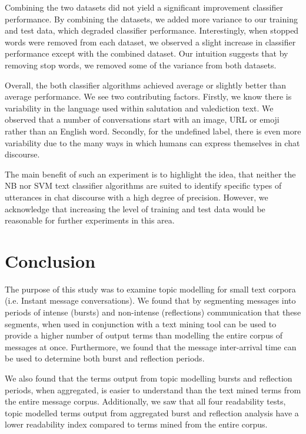 Combining the two datasets did not yield a significant improvement classifier performance. By combining the datasets, we added more variance to our training and test data, which degraded classifier performance. Interestingly, when stopped words were removed from each dataset, we observed a slight increase in classifier performance except with the combined dataset. Our intuition suggests that by removing stop words, we removed some of the variance from both datasets. 

Overall, the both classifier algorithms achieved average or slightly better than average performance. We see two contributing factors. Firstly, we know there is variability in the language used within salutation and valediction text. We observed that a number of conversations start with an image, URL or emoji rather than an English word. Secondly, for the undefined label, there is even more variability due to the many ways in which humans can express themselves in chat discourse.

The main benefit of such an experiment is to highlight the idea, that neither the NB nor SVM text classifier algorithms are suited to identify specific types of utterances in chat discourse with a high degree of precision. However, we acknowledge that increasing the level of training and test data would be reasonable for further experiments in this area.




\section{Conclusion}
The purpose of this study was to examine topic modelling for small text corpora (i.e. Instant message conversations). We found that by segmenting messages into periods of intense (bursts) and non-intense (reflections) communication that these segments, when used in conjunction with a text mining tool can be used to provide a higher number of output terms than modelling the entire corpus of messages at once. Furthermore, we found that the message inter-arrival time can be used to determine both burst and reflection periods.

We also found that the terms output from topic modelling bursts and reflection periods, when aggregated, is easier to understand than the text mined terms from the entire message corpus. Additionally, we saw that all four readability tests, topic modelled terms output from aggregated burst and reflection analysis have a lower readability index compared to terms mined from the entire corpus.

